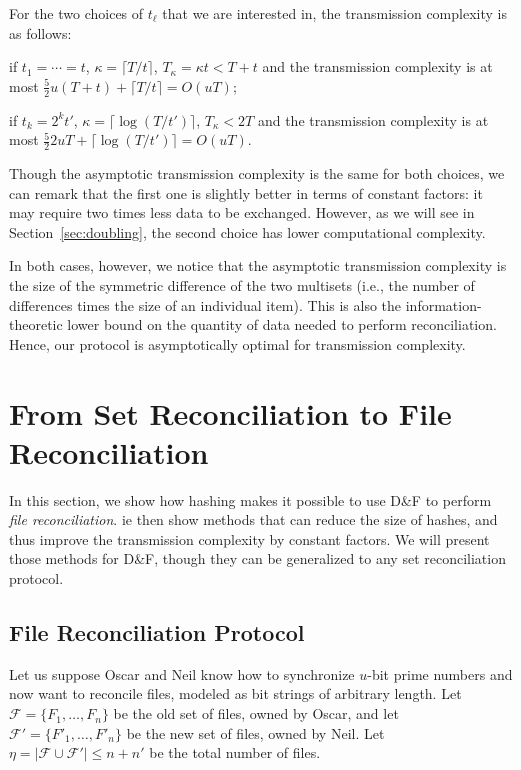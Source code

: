 \documentclass[twoside,envcountsame,runningheads]{llncs}
\newcommand{\Files}{\mathcal{F}}
\newcommand{\df}{D\&F\xspace}
\begin{document}
For the two choices of $t_\ell$ that we are interested in, the transmission complexity is as follows:
\begin{compactitem}
\item if $t_1 = \cdots = t$, $\kappa = \lceil T/t \rceil$, $T_\kappa = \kappa t < T+t$ and the transmission complexity is at most $\frac{5}{2} u (T+t) + \lceil T/t \rceil = O(uT)$;
\item if $t_k = 2^k t'$, $\kappa = \lceil \log(T/t') \rceil$, $T_\kappa < 2T$ and the transmission complexity is at most $\frac{5}{2} 2uT + \lceil \log(T/t') \rceil = O(uT)$.
\end{compactitem}
Though the asymptotic transmission complexity is the same for both choices, we can remark that the first one is slightly better in terms of constant factors: it may require two times less data to be exchanged.
However, as we will see in Section~\ref{sec:doubling}, the second choice has lower computational complexity.

In both cases, however, we notice that the asymptotic transmission complexity is the size of the symmetric difference of the two multisets (i.e., the number of differences times the size of an individual item). This is also the information-theoretic lower bound on the quantity of data needed to perform reconciliation. Hence, our protocol is asymptotically optimal for transmission complexity.

\section{From Set Reconciliation to File Reconciliation}
\label{sec:hashing}

In this section, we show how hashing makes it possible to use \df to perform \emph{file reconciliation}.
ie then show methods that can reduce the size of hashes, and thus improve the transmission complexity by constant factors. We will present those methods for \df, though they can be generalized to any set reconciliation protocol.

\subsection{File Reconciliation Protocol}

Let us suppose Oscar and Neil know how to synchronize $u$-bit prime numbers and now want to reconcile files, modeled as bit strings of arbitrary length.
Let $\Files = \{F_1,\dots,F_n\}$ be the old set of files, owned by Oscar, and let $\Files' = \{F'_1,\dots,F'_n\}$ be the new set of files, owned by Neil.
Let $\eta = | \Files \cup \Files'| \le n+n'$ be the total number of files.
\end{document}
